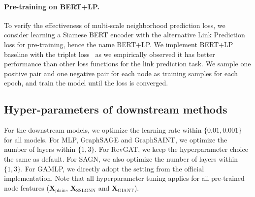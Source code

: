 \documentclass{article} %
\begin{document}
\begin{table*}[h]
    \centering
    \caption{Hyper-parameters of GIANT-XRT.
        $HLT$ defines the structures of the hierarchical label trees.
        $lr_{max}$ is the maximum learning rate in pre-training.
        $n_{step}$ is the number of optimization steps for each layer of HLT, respectively.
        $B$ is total number of batch size when using $8$ Nvidia V100 GPUs.
        $NS$ is the negative sampling strategy in XR-Transformer.
        $D$ is the $D$th layer of $HLT$ where we take the Transformer encoder to generate node embeddings as input for downstream GNN models.}
    \label{tb:xrt-hparams}
\end{table*}

\paragraph{Pre-training on BERT+LP.}
To verify the effectiveness of multi-scale neighborhood prediction loss, we consider learning a Siamese BERT encoder with the alternative Link Prediction loss for pre-training, hence the name BERT+LP.
We implement BERT+LP baseline with the triplet loss~\citep{balntas2016learning} as we empirically observed it has better performance than other loss functions for the link prediction task. 
We sample one positive pair and one negative pair for each node as training samples for each epoch, and train the model until the loss is converged.


\subsection{Hyper-parameters of downstream methods}
For the downstream models, we optimize the learning rate within $\{0.01,0.001\}$ for all models. For MLP, GraphSAGE and GraphSAINT, we optimize the number of layers within $\{1,3\}$. For RevGAT, we keep the hyperparameter choice the same as default. For SAGN, we also optimize the number of layers within $\{1,3\}$. For GAMLP, we directly adopt the setting from the official implementation. Note that all hyperparameter tuning applies for all pre-trained node features ($\mathbf{X}_{\text{plain}}$, $\mathbf{X}_{\text{SSLGNN}}$ and $\mathbf{X}_{\text{GIANT}}$). 
\end{document}
